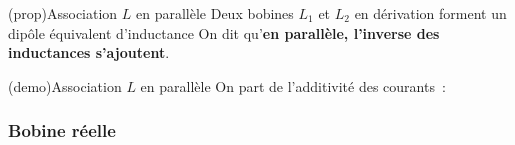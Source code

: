 \documentclass[../../main/main.tex]{subfiles}
\begin{document}
\begin{tcb*}[label=prop:bpara, sidebyside](prop){Association $L$ en parallèle}
	Deux bobines $L_1$ et $L_2$ en dérivation forment un dipôle
	équivalent d'inductance
	\psw{%
		\[
			\boxed{\dfrac{1}{L\ind{eq}} = \dfrac{1}{L_1} + \dfrac{1}{L_2}}
		\]
	}%
	On dit qu'\textbf{en parallèle, l'inverse des inductances s'ajoutent}.
	\tcblower
	\begin{center}
	\end{center}
\end{tcb*}
\begin{tcb*}[label=demo:bpara](demo){Association $L$ en parallèle}
	On part de l'additivité des courants~:
	\vspace{-15pt}
\end{tcb*}

\subsubsection{Bobine réelle}
\end{document}
